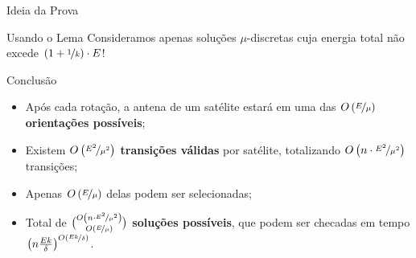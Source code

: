 \begin{frame}{Ideia da Prova}
  \begin{minipage}{\linewidth}
    \centering
  \end{minipage}
\end{frame}

\begin{frame}{Usando o Lema}
    Consideramos apenas soluções $\mu$-discretas cuja energia total não excede $(1 + \nicefrac{1}{k}) \cdot E$!
\end{frame}

\begin{frame}{Conclusão}
  \begin{itemize}[<+->]
    \item Após cada rotação, a antena de um satélite estará em uma das $O\left( \nicefrac{E}{\mu} \right)$ \textbf{orientações possíveis};

    \item Existem $O\left( \nicefrac{E^2}{\mu^2} \right)$ \textbf{transições válidas} por satélite, totalizando $O\left( n \cdot \nicefrac{E^2}{\mu^2} \right)$ transições;

    \item Apenas $O\left( \nicefrac{E}{\mu} \right)$ delas podem ser selecionadas;

    \bigbreak
    \item Total de $\binom{O\left( n \cdot \nicefrac{E^2}{\mu^2} \right)}{O\left( \nicefrac{E}{\mu} \right)}$ \textbf{soluções possíveis}, que podem ser checadas em tempo $\left( n \frac{E k}{\delta} \right)^{O\left( \nicefrac{E k}{\delta} \right)}$.
  \end{itemize}
\end{frame}
